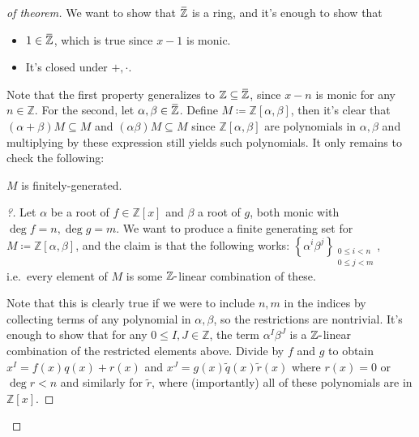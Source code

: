 \begin{proof}[of theorem]

We want to show that
\(\mkern 1.5mu\overline{\mkern-1.5mu{\mathbb{Z}}\mkern-1.5mu}\mkern 1.5mu\)
is a ring, and it's enough to show that

\begin{itemize}
\tightlist
\item
  \(1\in \mkern 1.5mu\overline{\mkern-1.5mu{\mathbb{Z}}\mkern-1.5mu}\mkern 1.5mu\),
  which is true since \(x-1\) is monic.
\item
  It's closed under \(+, \cdot\).
\end{itemize}

Note that the first property generalizes to
\({\mathbb{Z}}\subseteq \mkern 1.5mu\overline{\mkern-1.5mu{\mathbb{Z}}\mkern-1.5mu}\mkern 1.5mu\),
since \(x-n\) is monic for any \(n\in {\mathbb{Z}}\). For the second,
let
\(\alpha, \beta \in \mkern 1.5mu\overline{\mkern-1.5mu{\mathbb{Z}}\mkern-1.5mu}\mkern 1.5mu\).
Define \(M \coloneqq{\mathbb{Z}}[\alpha, \beta]\), then it's clear that
\((\alpha + \beta)M \subseteq M\) and \((\alpha \beta)M \subseteq M\)
since \({\mathbb{Z}}[\alpha, \beta]\) are polynomials in
\(\alpha, \beta\) and multiplying by these expression still yields such
polynomials. It only remains to check the following:

\begin{claim}

\(M\) is finitely-generated.

\end{claim}

\begin{proof}[?]

Let \(\alpha\) be a root of \(f \in {\mathbb{Z}}[x]\) and \(\beta\) a
root of \(g\), both monic with \(\deg f = n, \deg g = m\). We want to
produce a finite generating set for
\(M\coloneqq{\mathbb{Z}}[\alpha, \beta]\), and the claim is that the
following works:
\(\left\{{ \alpha^i \beta^j}\right\} _{\substack{0\leq i < n \\ 0 \leq j < m} }\),
i.e.~every element of \(M\) is some \({\mathbb{Z}}{\hbox{-}}\)linear
combination of these.

Note that this is clearly true if we were to include \(n, m\) in the
indices by collecting terms of any polynomial in \(\alpha, \beta\), so
the restrictions are nontrivial. It's enough to show that for any
\(0 \leq I, J \in {\mathbb{Z}}\), the term \(\alpha^I \beta^J\) is a
\({\mathbb{Z}}{\hbox{-}}\)linear combination of the restricted elements
above. Divide by \(f\) and \(g\) to obtain \(x^I = f(x) q(x) + r(x)\)
and \(x^J = g(x) \tilde q(x) \tilde r(x)\) where \(r(x) = 0\) or
\(\deg r < n\) and similarly for \(\tilde r\), where (importantly) all
of these polynomials are in \({\mathbb{Z}}[x]\).


\end{proof}
\end{proof}
